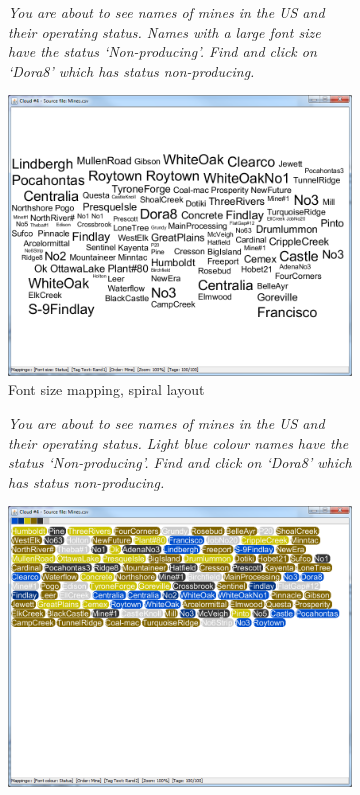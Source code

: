 \begin{figure}[!htb]
\centering
\begin{subfigure}{.3\textwidth}
  \centering
  \textit{You are about to see names of mines in the US and their operating status.
  		Names with a large font size have the status `Non-producing'. 
  		Find and click on `Dora8' which has status non-producing.}
  \label{fig:instructionsM1Spiral}
\end{subfigure}%
\begin{subfigure}{.7\textwidth}
  \centering
  \includegraphics[scale=0.30]{M1Spiral.png}
  \caption{Font size mapping, spiral layout}
  \label{fig:M1Spiral}
\end{subfigure}
\begin{subfigure}{.3\textwidth}
  \centering
   \textit{You are about to see names of mines in the US and their operating status.
 		 Light blue colour names have the status `Non-producing'. 
  		Find and click on `Dora8' which has status non-producing.}
\end{subfigure}%
\begin{subfigure}{.7\textwidth}
  \centering
  \includegraphics[scale=0.30]{M2Typewriter.png}

\end{subfigure}
\end{figure}
